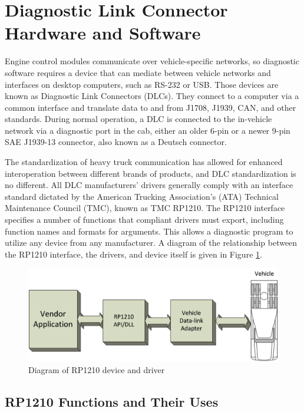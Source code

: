 \section{Diagnostic Link Connector Hardware and Software}

Engine control modules communicate over vehicle-specific networks, so diagnostic software requires a device that can mediate between
vehicle networks and interfaces on desktop computers, such as RS-232 or USB. Those devices are known as Diagnostic Link Connectors (DLCs).
They connect to a computer via a common interface and translate data to and from J1708, J1939, CAN, and other standards. During normal
operation, a DLC is connected to the in-vehicle network via a diagnostic port in the cab, either an older 6-pin or a newer 9-pin SAE J1939-13 connector\cite{J1939-13},
also known as a Deutsch connector.

The standardization of heavy truck communication has allowed for enhanced interoperation between different brands of products, and DLC
standardization is no different. All DLC manufacturers' drivers generally comply with an interface standard dictated by the American Trucking Association's (ATA)
Technical Maintenance Council (TMC), known as TMC RP1210\cite{RP1210}. The RP1210 interface specifies a number of functions that compliant drivers must export,
including function names and formats for arguments. This allows a diagnostic program to utilize any device from any manufacturer. A diagram of the relationship between
the RP1210 interface, the drivers, and device itself is given in Figure \ref{fig:rp1210}.

\begin{figure}[h]
  \centering
  \includegraphics{RP1210}
  \caption{Diagram of RP1210 device and driver}
  \label{fig:rp1210}
\end{figure}

\subsection{RP1210 Functions and Their Uses}

